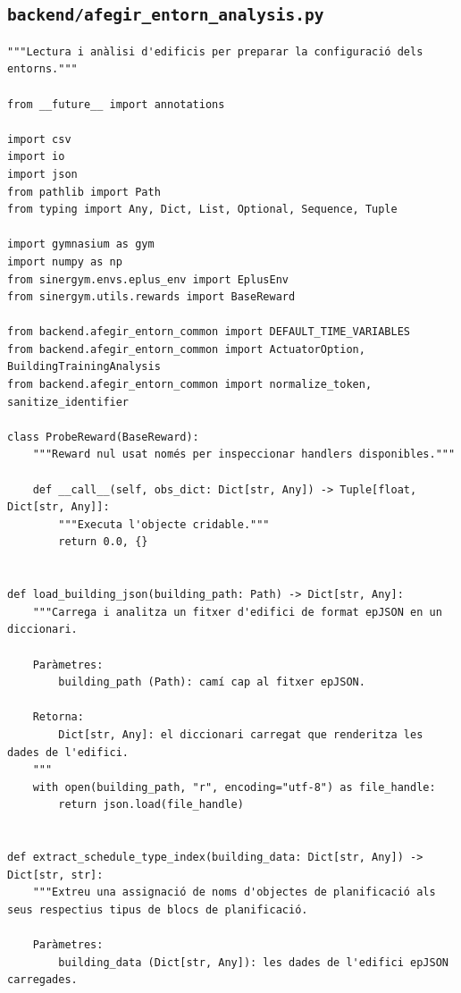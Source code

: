 \documentclass[10pt,a4paper]{article}
\begin{document}

\subsection{\texorpdfstring{\texttt{backend/afegir\_entorn\_analysis.py}}{backend/afegir\_entorn\_analysis.py}}

\begin{lstlisting}[style=studioPython,caption={backend/afegir\_entorn\_analysis.py},label={lst:backend-afegir-entorn-analysis-py}]
"""Lectura i anàlisi d'edificis per preparar la configuració dels entorns."""

from __future__ import annotations

import csv
import io
import json
from pathlib import Path
from typing import Any, Dict, List, Optional, Sequence, Tuple

import gymnasium as gym
import numpy as np
from sinergym.envs.eplus_env import EplusEnv
from sinergym.utils.rewards import BaseReward

from backend.afegir_entorn_common import DEFAULT_TIME_VARIABLES
from backend.afegir_entorn_common import ActuatorOption, BuildingTrainingAnalysis
from backend.afegir_entorn_common import normalize_token, sanitize_identifier

class ProbeReward(BaseReward):
    """Reward nul usat només per inspeccionar handlers disponibles."""

    def __call__(self, obs_dict: Dict[str, Any]) -> Tuple[float, Dict[str, Any]]:
        """Executa l'objecte cridable."""
        return 0.0, {}


def load_building_json(building_path: Path) -> Dict[str, Any]:
    """Carrega i analitza un fitxer d'edifici de format epJSON en un diccionari.

    Paràmetres:
        building_path (Path): camí cap al fitxer epJSON.

    Retorna:
        Dict[str, Any]: el diccionari carregat que renderitza les dades de l'edifici.
    """
    with open(building_path, "r", encoding="utf-8") as file_handle:
        return json.load(file_handle)


def extract_schedule_type_index(building_data: Dict[str, Any]) -> Dict[str, str]:
    """Extreu una assignació de noms d'objectes de planificació als seus respectius tipus de blocs de planificació.

    Paràmetres:
        building_data (Dict[str, Any]): les dades de l'edifici epJSON carregades.


\end{lstlisting}
\end{document}
